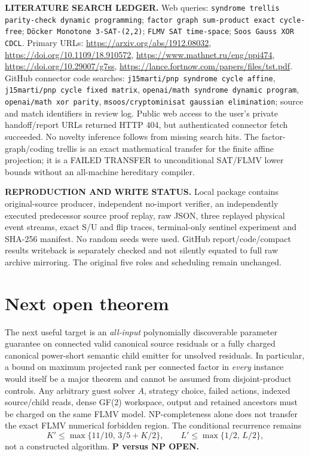 \documentclass[11pt]{article}
\begin{document}
\noindent\textbf{LITERATURE SEARCH LEDGER.} Web queries: \texttt{syndrome trellis parity-check dynamic programming}; \texttt{factor graph sum-product exact cycle-free}; \texttt{D\"ocker Monotone 3-SAT-(2,2)}; \texttt{FLMV SAT time-space}; \texttt{Soos Gauss XOR CDCL}. Primary URLs: \url{https://arxiv.org/abs/1912.08032}, \url{https://doi.org/10.1109/18.910572}, \url{https://www.mathnet.ru/eng/ppi474}, \url{https://doi.org/10.29007/g7ss}, \url{https://lance.fortnow.com/papers/files/tst.pdf}. GitHub connector code searches: \texttt{j15marti/pnp syndrome cycle affine}, \texttt{j15marti/pnp cycle fixed matrix}, \texttt{openai/math syndrome dynamic program}, \texttt{openai/math xor parity}, \texttt{msoos/cryptominisat gaussian elimination}; source and match identifiers in review log. Public web access to the user's private handoff/report URLs returned HTTP 404, but authenticated connector fetch succeeded. No novelty inference follows from missing search hits. The factor-graph/coding trellis is an exact mathematical transfer for the finite affine projection; it is a FAILED TRANSFER to unconditional SAT/FLMV lower bounds without an all-machine hereditary compiler.\par
\noindent\textbf{REPRODUCTION AND WRITE STATUS.} Local package contains original-source producer, independent no-import verifier, an independently executed predecessor source proof replay, raw JSON, three replayed physical event streams, exact S/U and flip traces, terminal-only sentinel experiment and SHA-256 manifest. No random seeds were used. GitHub report/code/compact results writeback is separately checked and not silently equated to full raw archive mirroring. The original five roles and scheduling remain unchanged.

\section{Next open theorem}
The next useful target is an \emph{all-input} polynomially discoverable parameter guarantee on connected valid canonical source residuals or a fully charged canonical power-short semantic child emitter for unsolved residuals. In particular, a bound on maximum projected rank per connected factor in \emph{every} instance would itself be a major theorem and cannot be assumed from disjoint-product controls. Any arbitrary guest solver $A$, strategy choice, failed actions, indexed source/child reads, dense GF(2) workspace, output and retained ancestors must be charged on the same FLMV model. NP-completeness alone does not transfer the exact FLMV numerical forbidden region. The conditional recurrence remains
\[
 K'\le\max\{11/10,\,3/5+K/2\},\qquad L'\le\max\{1/2,\,L/2\},
\]
not a constructed algorithm. \textbf{P versus NP OPEN.}
\end{document}
